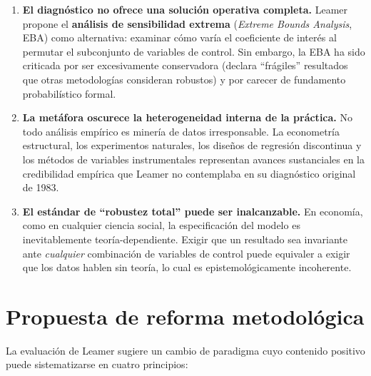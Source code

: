 \documentclass[12pt, letterpaper]{article}
\begin{document}
\begin{enumerate}[leftmargin=1.8cm, label=\textbf{\arabic*.}]

  \item \textbf{El diagnóstico no ofrece una solución operativa completa.}
    Leamer propone el \textbf{análisis de sensibilidad extrema}
    (\textit{Extreme Bounds Analysis}, EBA) como alternativa: examinar
    cómo varía el coeficiente de interés al permutar el subconjunto de
    variables de control. Sin embargo, la EBA ha sido criticada por ser
    excesivamente conservadora (declara ``frágiles'' resultados que otras
    metodologías consideran robustos) y por carecer de fundamento
    probabilístico formal.

  \item \textbf{La metáfora oscurece la heterogeneidad interna de la
    práctica.} No todo análisis empírico es minería de datos irresponsable.
    La econometría estructural, los experimentos naturales, los diseños
    de regresión discontinua y los métodos de variables instrumentales
    representan avances sustanciales en la credibilidad empírica que
    Leamer no contemplaba en su diagnóstico original de 1983.

  \item \textbf{El estándar de ``robustez total'' puede ser
    inalcanzable.} En economía, como en cualquier ciencia social, la
    especificación del modelo es inevitablemente teoría-dependiente.
    Exigir que un resultado sea invariante ante \emph{cualquier}
    combinación de variables de control puede equivaler a exigir que
    los datos hablen sin teoría, lo cual es epistemológicamente incoherente.

\end{enumerate}

\section{Propuesta de reforma metodológica}

La evaluación de Leamer sugiere un cambio de paradigma cuyo contenido
positivo puede sistematizarse en cuatro principios:
\end{document}
